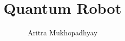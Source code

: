 \documentclass[12pt]{article}
\title{Quantum Robot}
\author{Aritra Mukhopadhyay}
\date{} %
\begin{document}
    

    

    \pagebreak
    \tableofcontents
    
    \pagebreak
    
    
    
    
    
    
    
    
    
    \pagebreak %
    \listoffigures
    \listoftables
    
    
    \nocite{*}
\end{document}

